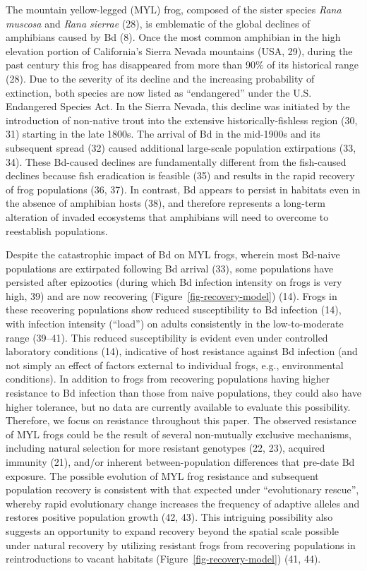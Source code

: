 \documentclass[9pt,twocolumn,twoside,lineno]{pnas-new}
\begin{document}
The mountain yellow-legged (MYL) frog, composed of the sister species
\emph{Rana muscosa} and \emph{Rana sierrae} (28), is emblematic of the
global declines of amphibians caused by Bd (8). Once the most common
amphibian in the high elevation portion of California's Sierra Nevada
mountains (USA, 29), during the past century this frog has disappeared
from more than 90\% of its historical range (28). Due to the severity of
its decline and the increasing probability of extinction, both species
are now listed as ``endangered'' under the U.S. Endangered Species Act.
In the Sierra Nevada, this decline was initiated by the introduction of
non-native trout into the extensive historically-fishless region (30,
31) starting in the late 1800s. The arrival of Bd in the mid-1900s and
its subsequent spread (32) caused additional large-scale population
extirpations (33, 34). These Bd-caused declines are fundamentally
different from the fish-caused declines because fish eradication is
feasible (35) and results in the rapid recovery of frog populations (36,
37). In contrast, Bd appears to persist in habitats even in the absence
of amphibian hosts (38), and therefore represents a long-term alteration
of invaded ecosystems that amphibians will need to overcome to
reestablish populations.

Despite the catastrophic impact of Bd on MYL frogs, wherein most
Bd-naive populations are extirpated following Bd arrival (33), some
populations have persisted after epizootics (during which Bd infection
intensity on frogs is very high, 39) and are now recovering
(Figure~\ref{fig-recovery-model}) (14). Frogs in these recovering
populations show reduced susceptibility to Bd infection (14), with
infection intensity (``load'') on adults consistently in the
low-to-moderate range (39--41). This reduced susceptibility is evident
even under controlled laboratory conditions (14), indicative of host
resistance against Bd infection (and not simply an effect of factors
external to individual frogs, e.g., environmental conditions). In
addition to frogs from recovering populations having higher resistance
to Bd infection than those from naive populations, they could also have
higher tolerance, but no data are currently available to evaluate this
possibility. Therefore, we focus on resistance throughout this paper.
The observed resistance of MYL frogs could be the result of several
non-mutually exclusive mechanisms, including natural selection for more
resistant genotypes (22, 23), acquired immunity (21), and/or inherent
between-population differences that pre-date Bd exposure. The possible
evolution of MYL frog resistance and subsequent population recovery is
consistent with that expected under ``evolutionary rescue'', whereby
rapid evolutionary change increases the frequency of adaptive alleles
and restores positive population growth (42, 43). This intriguing
possibility also suggests an opportunity to expand recovery beyond the
spatial scale possible under natural recovery by utilizing resistant
frogs from recovering populations in reintroductions to vacant habitats
(Figure~\ref{fig-recovery-model}) (41, 44).
\end{document}
